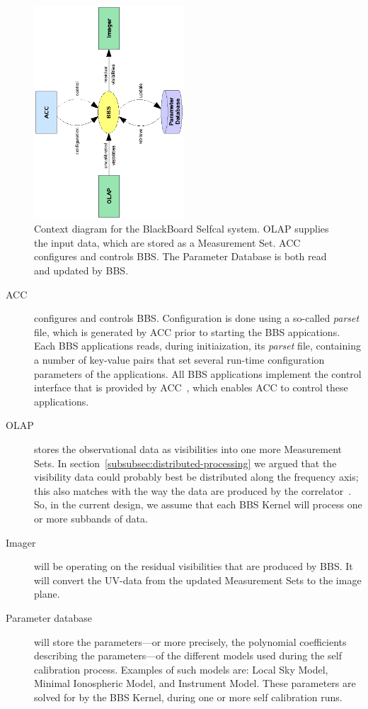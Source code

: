 \documentclass[10pt]{lofar}
\begin{document}
\begin{figure}[!ht]
\centering
\includegraphics[width=0.5\textwidth,angle=-90]{images/bbs-context-diagram}
\caption{Context diagram for the BlackBoard Selfcal system. OLAP supplies the
input data, which are stored as a Measurement Set. ACC configures and controls
BBS. The Parameter Database
is both read and updated by BBS.}
\label{fig:bbs-context-diagram}
\end{figure}

\begin{description}
\item [ACC] configures and controls BBS. Configuration is done using a so-called \emph{parset} file, which is generated by ACC prior to starting the BBS appications. Each BBS applications reads, during initiaization, its \emph{parset} file, containing a number of key-value pairs that set several run-time configuration parameters of the applications. All BBS applications implement the control interface that is provided by ACC~\cite{LOFAR-ASTRON-SDD-037}, which enables ACC to control these applications.
\item [OLAP] stores the observational data as visibilities into one more Measurement Sets. In section~\ref{subsubsec:distributed-processing} we argued that the visibility data could probably best be distributed along the frequency axis; this also matches with the way the data are produced by the correlator~\cite{LOFAR-ASTRON-SDD-036}. So, in the current design, we assume that each BBS Kernel will process one or more subbands of data.
\item [Imager] will be operating on the residual visibilities that are produced by BBS. It will convert the UV-data from the updated Measurement Sets to the image plane. 
\item [Parameter database] \sloppy will store the parameters---or more precisely, the polynomial coefficients describing the parameters---of the different models used during the self calibration process. Examples of such models are: Local Sky Model, Minimal Ionospheric Model, and Instrument Model. These parameters are solved for by the BBS Kernel, during one or more self calibration runs.
\end{description}
\end{document}
